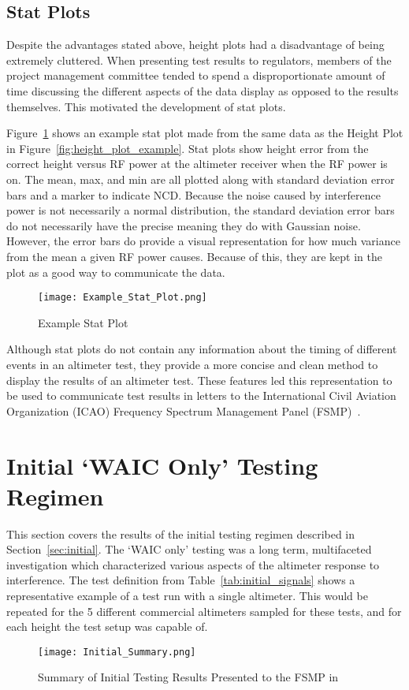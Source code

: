 \subsection{Stat Plots}
Despite the advantages stated above, height plots had a disadvantage of being extremely cluttered. When presenting test results to regulators, members of the project management committee tended to spend a disproportionate amount of time discussing the different aspects of the data display as opposed to the results themselves. This motivated the development of stat plots.

Figure~\ref{fig:stat_plot_example} shows an example stat plot made from the same data as the Height Plot in Figure~\ref{fig:height_plot_example}. Stat plots show height error from the correct height versus RF power at the altimeter receiver when the RF power is on. The mean, max, and min are all plotted along with standard deviation error bars and a marker to indicate NCD. Because the noise caused by interference power is not necessarily a normal distribution, the standard deviation error bars do not necessarily have the precise meaning they do with Gaussian noise. However, the error bars do provide a visual representation for how much variance from the mean a given RF power causes. Because of this, they are kept in the plot as a good way to communicate the data.  
\begin{figure}[h!]
	\centering
	\texttt{[image: Example\_Stat\_Plot.png]}
	\caption{Example Stat Plot}
	\label{fig:stat_plot_example}
\end{figure}

 Although stat plots do not contain any information about the timing of different events in an altimeter test, they provide a more concise and clean method to display the results of an altimeter test. These features led this representation to be used to communicate test results in letters to the International Civil Aviation Organization (ICAO) Frequency Spectrum Management Panel (FSMP)~\cite{uwe_radio_2019}. 
 
 
\section{Initial `WAIC Only' Testing Regimen}\label{sec:initial_results}

This section covers the results of the initial testing regimen described in Section~\ref{sec:initial}. The `WAIC only' testing was a long term, multifaceted investigation which characterized various aspects of the altimeter response to interference. The test definition from Table~\ref{tab:initial_signals} shows a representative example of a test run with a single altimeter. This would be repeated for the 5 different commercial altimeters sampled for these tests, and for each height the test setup was capable of. 
\begin{figure}[h!]
	\centering
	\texttt{[image: Initial\_Summary.png]}
	\caption{Summary of Initial Testing Results Presented to the FSMP in~\cite{uwe_radio_2019}}
	\label{fig:initial_summary}
\end{figure}

